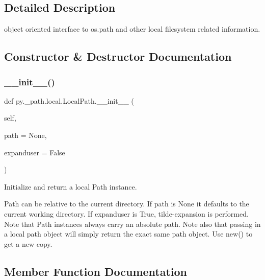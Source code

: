 \subsection{Detailed Description}
\begin{DoxyVerb}object oriented interface to os.path and other local filesystem
    related information.
\end{DoxyVerb}
 

\subsection{Constructor \& Destructor Documentation}
\mbox{\label{classpy_1_1__path_1_1local_1_1_local_path_a84171a8017450af601b0adb2d37705fe}} 
\subsubsection{\texorpdfstring{\+\_\+\+\_\+init\+\_\+\+\_\+()}{\_\_init\_\_()}}
{\footnotesize\ttfamily def py.\+\_\+path.\+local.\+Local\+Path.\+\_\+\+\_\+init\+\_\+\+\_\+ (\begin{DoxyParamCaption}\item[{}]{self,  }\item[{}]{path = {\ttfamily None},  }\item[{}]{expanduser = {\ttfamily False} }\end{DoxyParamCaption})}

\begin{DoxyVerb}Initialize and return a local Path instance.

Path can be relative to the current directory.
If path is None it defaults to the current working directory.
If expanduser is True, tilde-expansion is performed.
Note that Path instances always carry an absolute path.
Note also that passing in a local path object will simply return
the exact same path object. Use new() to get a new copy.
\end{DoxyVerb}
 

\subsection{Member Function Documentation}
\mbox{\label{classpy_1_1__path_1_1local_1_1_local_path_a3d604cf8849802d2219d796da99bb5b0}} 
